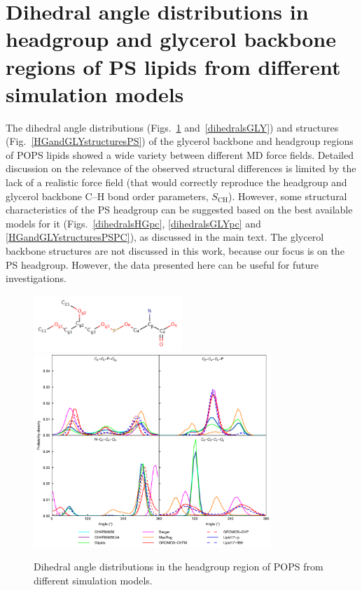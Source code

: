 \documentclass[journal=jpcbfk,manuscript=article]{achemso}
\begin{document}
\pagebreak
\section{Dihedral angle distributions in headgroup and glycerol backbone
  regions of PS lipids from different simulation models}\label{Diheds}

The dihedral angle distributions (Figs.~\ref{dihedralsHG} and~\ref{dihedralsGLY}) and structures (Fig.~\ref{HGandGLYstructuresPS}) of the glycerol backbone and headgroup regions of POPS lipids showed a
wide variety between different MD force fields.
Detailed discussion on the relevance of the observed structural differences is limited by the lack of a realistic force field (that would correctly reproduce the
headgroup and glycerol backbone C--H bond order parameters, $S_\mathrm{CH}$). However, some structural characteristics
of the PS headgroup can be suggested based on the best available models for it
(Figs.~\ref{dihedralsHGpc}, \ref{dihedralsGLYpc} and \ref{HGandGLYstructuresPSPC}), as discussed in the main text.
The glycerol backbone structures are not discussed in this work, because our focus is on the PS headgroup.
However, the data presented here can be useful for future investigations.

\begin{figure}[]
  \centering
  \includegraphics[width=0.5\textwidth]{../Figs/PS_Labels.png}
  \includegraphics[width=0.8\textwidth]{../Figs/figS7.png}
  \caption{\label{dihedralsHG}
    Dihedral angle distributions in the headgroup region of POPS from different simulation models.
  }
\end{figure}
\end{document}

